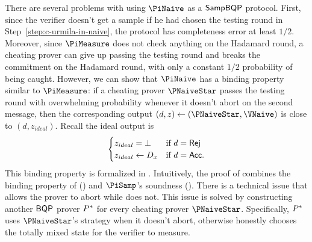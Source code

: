 There are several problems with using $\PiNaive$ as a $\operatorname{\mathsf{SampBQP}}$ protocol. First, since the verifier doesn't get a sample if he had chosen the testing round in Step~\ref{step:c-urmila-in-naive}, the protocol has completeness error at least $1/2$. Moreover, since $\PiMeasure$ does not check anything on the Hadamard round, a cheating prover can give up passing the testing round and breaks the commitment on the Hadamard round, with only a constant $1/2$ probability of being caught.
However, we can show that $\PiNaive$ has a binding property similar to $\PiMeasure$:
if a cheating prover $\PNaiveStar$ passes the testing round with overwhelming probability whenever it doesn't abort on the second message,
then the corresponding output $(d, z)\leftarrow(\PNaiveStar, \VNaive)$ is close to $(d, z_{ideal})$.
Recall the ideal output is
$$\begin{cases}
	z_{ideal}=\bot & \text{if } d=\mathsf{Rej}\\
	z_{ideal}\leftarrow D_x & \text{if } d=\mathsf{Acc}.
\end{cases}$$
This binding property is formalized in .
Intuitively,  the proof of   combines the binding property of  () and $\PiSamp$'s soundness (). There is a technical issue that  allows the prover to abort while  does not. This issue is solved by constructing another $\operatorname{\mathsf{BQP}}$ prover $P^*$ for every cheating prover $\PNaiveStar$. 
Specifically, $P^*$ uses $\PNaiveStar$'s strategy when it doesn't abort, otherwise honestly chooses the totally mixed state for the verifier to measure.


